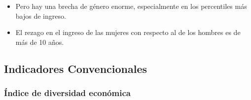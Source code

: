     \begin{tcolorbox}[enhanced, colback=mycolor,colframe=mycolor,drop fuzzy shadow,watermark color=white,
                        title=Principales Resultados]
    
                    \begin{itemize}
                    \item Pero hay una brecha de género enorme, especialmente en los percentiles más bajos de ingreso.
                    \item El rezago en el ingreso de las mujeres con respecto al de los hombres es de más de 10 años.
                \end{itemize}
     
    \end{tcolorbox}
    
    
    \subsection{Indicadores Convencionales}
        \subsubsection{Índice de diversidad económica}

